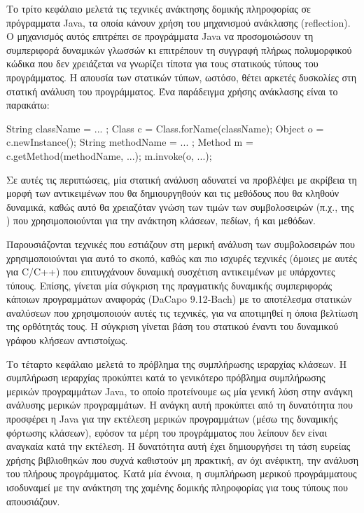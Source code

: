 Το τρίτο κεφάλαιο μελετά τις τεχνικές ανάκτησης δομικής πληροφορίας σε
πρόγραμματα {\en Java}, τα οποία κάνουν χρήση του μηχανισμού ανάκλασης
({\en reflection}).  Ο μηχανισμός αυτός επιτρέπει σε προγράμματα {\en
  Java} να προσομοιώσουν τη συμπεριφορά δυναμικών γλωσσών κι
επιτρέπουν τη συγγραφή πλήρως πολυμορφικού κώδικα που δεν χρειάζεται
να γνωρίζει τίποτα για τους στατικούς τύπους του προγράμματος. Η
απουσία των στατικών τύπων, ωστόσο, θέτει αρκετές δυσκολίες στη
στατική ανάλυση του προγράμματος. Ένα παράδειγμα χρήσης ανάκλασης
είναι το παρακάτω:
{\en
  \begin{javacodelinum}
    String className = ... ;
    Class c = Class.forName(className);
    Object o = c.newInstance();
    String methodName = ... ;
    Method m = c.getMethod(methodName, ...);
    m.invoke(o, ...);
  \end{javacodelinum}
}

Σε αυτές τις περιπτώσεις, μία στατική ανάλυση αδυνατεί να προβλέψει με
ακρίβεια τη μορφή των αντικειμένων που θα δημιουργηθούν και τις μεθόδους
που θα κληθούν δυναμικά, καθώς αυτό θα χρειαζόταν γνώση των τιμών των
συμβολοσειρών (π.χ., της {\en {}}) που χρησιμοποιούνται
για την ανάκτηση κλάσεων, πεδίων, ή και μεθόδων.

Παρουσιάζονται τεχνικές που εστιάζουν στη μερική ανάλυση των
συμβολοσειρών που χρησιμοποιούνται για αυτό το σκοπό, καθώς και πιο
ισχυρές τεχνικές (όμοιες με αυτές για {\en C/C++}) που επιτυγχάνουν
δυναμική συσχέτιση αντικειμένων με υπάρχοντες τύπους.  Επίσης, γίνεται
μία σύγκριση της πραγματικής δυναμικής συμπεριφοράς κάποιων
προγραμμάτων αναφοράς ({\en DaCapo 9.12-Bach}) με το αποτέλεσμα
στατικών αναλύσεων που χρησιμοποιούν αυτές τις τεχνικές, για να
αποτιμηθεί η όποια βελτίωση της ορθότητάς τους. Η σύγκριση γίνεται
βάση του στατικού έναντι του δυναμικού γράφου κλήσεων αντιστοίχως.



Το τέταρτο κεφάλαιο μελετά το πρόβλημα της συμπλήρωσης ιεραρχίας
κλάσεων. Η συμπλήρωση ιεραρχίας προκύπτει κατά το γενικότερο πρόβλημα
συμπλήρωσης μερικών προγραμμάτων {\en Java}, το οποίο προτείνουμε ως
μία γενική λύση στην ανάγκη ανάλυσης μερικών προγραμμάτων. Η ανάγκη
αυτή προκύπτει από τη δυνατότητα που προσφέρει η {\en Java} για την
εκτέλεση μερικών προγραμμάτων (μέσω της δυναμικής φόρτωσης κλάσεων),
εφόσον τα μέρη του προγράμματος που λείπουν δεν είναι αναγκαία κατά
την εκτέλεση. Η δυνατότητα αυτή έχει δημιουργήσει τη τάση ευρείας
χρήσης βιβλιοθηκών που συχνά καθιστούν μη πρακτική, αν όχι ανέφικτη,
την ανάλυση του πλήρους προγράμματος. Κατά μία έννοια, η συμπλήρωση
μερικού προγράμματους ισοδυναμεί με την ανάκτηση της χαμένης δομικής
πληροφορίας για τους τύπους που απουσιάζουν.

